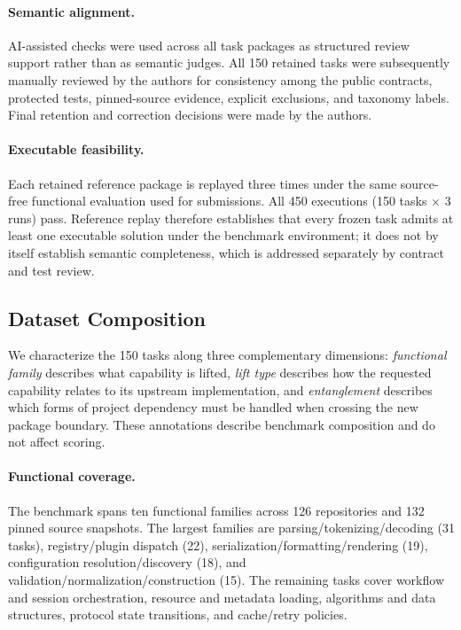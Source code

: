 \documentclass[acmsmall,screen,review,anonymous]{acmart}
\begin{document}
\paragraph{Semantic alignment.}
AI-assisted checks were used across all task packages as structured review
support rather than as semantic judges. All 150 retained tasks were subsequently
manually reviewed by the authors for consistency among the public contracts,
protected tests, pinned-source evidence, explicit exclusions, and taxonomy
labels. Final retention and correction decisions were made by the authors.

\paragraph{Executable feasibility.}
Each retained reference package is replayed three times under the same
source-free functional evaluation used for submissions. All 450 executions
(150 tasks $\times$ 3 runs) pass. Reference replay therefore establishes that
every frozen task admits at least one executable solution under the benchmark
environment; it does not by itself establish semantic completeness, which is
addressed separately by contract and test review.



\subsection{Dataset Composition}
\label{sec:suite}

We characterize the 150 tasks along three complementary dimensions:
\emph{functional family} describes what capability is lifted, \emph{lift type}
describes how the requested capability relates to its upstream implementation,
and \emph{entanglement} describes which forms of project dependency must be
handled when crossing the new package boundary. These annotations describe
benchmark composition and do not affect scoring.

\paragraph{Functional coverage.}
The benchmark spans ten functional families across 126 repositories and 132
pinned source snapshots. The largest families are parsing/tokenizing/decoding
(31 tasks), registry/plugin dispatch (22), serialization/formatting/rendering
(19), configuration resolution/discovery (18), and
validation/normalization/construction (15). The remaining tasks cover workflow
and session orchestration, resource and metadata loading, algorithms and data
structures, protocol state transitions, and cache/retry policies.
\end{document}
